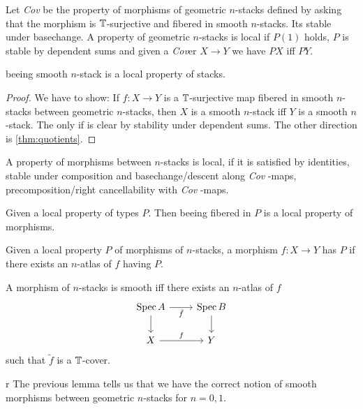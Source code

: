 \documentclass{article}
\newcommand{\Cov}{\emph{Cov} }
\newcommand{\Cover}{\emph{Cov}er }
\begin{document}
\begin{definition}
Let \Cov be the property of morphisms of geometric $n$-stacks defined by asking that the morphism is $\mathbb{T}$-surjective and fibered in smooth $n$-stacks. Its stable under basechange. A property of geometric $n$-stacks is local if $P(1)$ holds, $P$ is stable by dependent sums and given a \Cover  $X \to Y$ we have $P X$ iff $P Y$.
\end{definition}
\begin{example}    
    beeing smooth $n$-stack is a local property of stacks.
\end{example}
\begin{proof}
    We have to show: If $f : X \to Y$ is a $\mathbb{T}$-surjective map fibered in smooth $n$-stacks between geometric $n$-stacks, then $X$ is a smooth $n$-stack iff $Y$ is a smooth $n$-stack.
    The only if is clear by stability under dependent sums. The other direction is \ref{thm:quotients}.
    
\end{proof}

\begin{definition}
    A property of morphisms between $n$-stacks is local, if it is satisfied by identities, stable under composition and basechange/descent along \Cov-maps, precomposition/right cancellability with \Cov-maps.
\end{definition}
\begin{lemma}
    Given a local property of types $P$. Then beeing fibered in $P$ is a local property of morphisms.
\end{lemma}
\begin{lemma}[\todocite]
    Given a local property $P$ of morphisms of $n$-stacks, a morphism $f : X \to Y$ has $P$ if there exists an $n$-atlas of $f$ having $P$.
\end{lemma}
\begin{example}
    A morphism of $n$-stacks is smooth iff there exists an $n$-atlas of $f$ 
\[\begin{tikzcd}
	{\Spec A} & {\Spec B} \\
	X & Y
	\arrow["{\tilde f}"', from=1-1, to=1-2]
	\arrow[from=1-1, to=2-1]
	\arrow[from=1-2, to=2-2]
	\arrow["f", from=2-1, to=2-2]
\end{tikzcd}\]
such that $\tilde f$ is a $\mathbb{T}$-cover.
\end{example}r
The previous lemma tells us that we have the correct notion of smooth morphisms between geometric $n$-stacks for $n = 0,1$.
\end{document}
